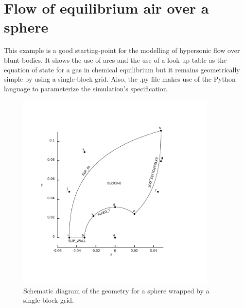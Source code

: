 
\newpage
\section{Flow of equilibrium air over a sphere}
%
This example is a good starting-point for the modelling of 
hypersonic flow over blunt bodies. 
It shows the use of arcs and the use of a look-up table 
as the equation of state for a gas in chemical equilibrium but
it remains geometrically simple by using a single-block grid.
Also, the .py file makes use of the Python language to parameterize
the simulation's specification.


\begin{figure}[htbp]
\begin{center}
\includegraphics[width=10cm,viewport=41 69 346 388,clip=true]{../2D/sawada_sphere/ss3-layout.pdf}
\end{center}
\caption{Schematic diagram of the geometry for a sphere 
         wrapped by a single-block grid.}
\label{sawada-geometry-fig}
\end{figure}

